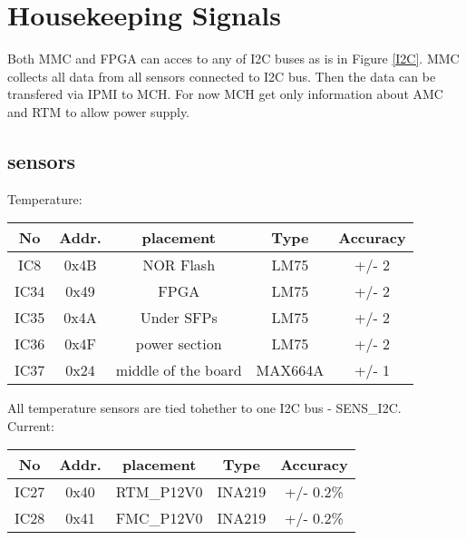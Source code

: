 \section{Housekeeping Signals}
Both MMC and FPGA can acces to any of I2C buses as is in Figure \ref{I2C}. MMC collects all data from all sensors connected to I2C bus. Then the data can be transfered via IPMI to MCH. For now MCH get only information about AMC and RTM to allow power supply.

\subsection{sensors}
Temperature:\\
\begin{longtable}{|c|c|c|c|c|}\hline
	No & Addr. & placement & Type & Accuracy \\ \hline
	IC8 & 0x4B & NOR Flash & LM75 & +/- 2 \\ \hline
	IC34 & 0x49 & FPGA & LM75 & +/- 2  \\ \hline
	IC35 & 0x4A & Under SFPs & LM75 & +/- 2  \\ \hline	
	IC36 & 0x4F & power section & LM75 & +/- 2  \\ \hline
	IC37 & 0x24 & middle of the board & MAX664A & +/- 1 \\ \hline
\end{longtable}

All temperature sensors are tied tohether to one I2C bus - SENS\_I2C. \\


Current:
\begin{longtable}{|c|c|c|c|c|}\hline
		No & Addr. & placement & Type & Accuracy \\ \hline
		IC27 & 0x40 &RTM\_P12V0& INA219 & +/- 0.2\% \\ \hline
		IC28 & 0x41 &FMC\_P12V0& INA219 & +/- 0.2\% \\ \hline
\end{longtable}


